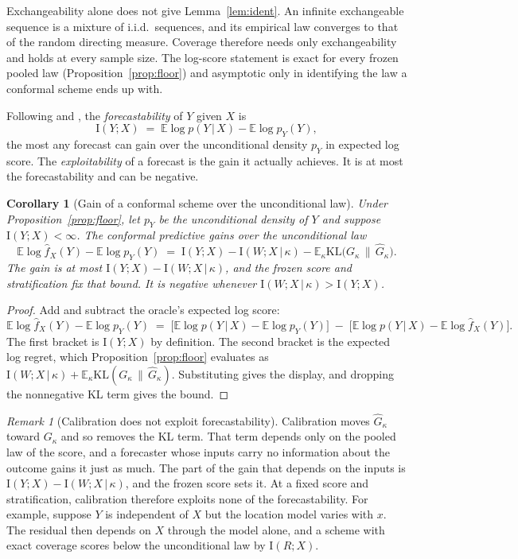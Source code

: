\documentclass[11pt]{article}
\newtheorem{corollary}[proposition]{Corollary}
\theoremstyle{remark}
\newtheorem{remark}[proposition]{Remark}
\newcommand{\E}{\mathbb{E}}
\newcommand{\I}{\mathrm{I}}
\newcommand{\given}{\,|\,}
\newcommand{\KLop}{\mathrm{KL}}
\begin{document}
Exchangeability alone does not give Lemma~\ref{lem:ident}. An infinite exchangeable
sequence is a mixture of i.i.d.\ sequences, and its empirical law converges to that of
the random directing measure. Coverage therefore needs only exchangeability and holds
at every sample size. The log-score statement is exact for every frozen pooled law
(Proposition~\ref{prop:floor}) and asymptotic only in identifying the law a conformal
scheme ends up with.

Following \citet{delsole2004} and \citet{catt2026}, the \emph{forecastability} of $Y$
given $X$ is
\[
\I(Y;X)\;=\;\E\log p(Y\given X)-\E\log p_Y(Y),
\]
the most any forecast can gain over the unconditional density $p_Y$ in expected log
score. The \emph{exploitability} of a forecast is the gain it actually achieves. It is
at most the forecastability and can be negative.

\begin{corollary}[Gain of a conformal scheme over the unconditional law]\label{cor:forecastability}
Under Proposition~\ref{prop:floor}, let $p_Y$ be the unconditional density of $Y$ and
suppose $\I(Y;X)<\infty$. The conformal predictive gains over the unconditional law
\[
\E\log\widehat f_X(Y)-\E\log p_Y(Y)
\;=\;\I(Y;X)-\I(W;X\given\kappa)-\E_\kappa\KLop\!\big(G_\kappa\,\|\,\widehat G_\kappa\big).
\]
The gain is at most $\I(Y;X)-\I(W;X\given\kappa)$, and the frozen score and
stratification fix that bound. It is negative whenever $\I(W;X\given\kappa)>\I(Y;X)$.
\end{corollary}

\begin{proof}
Add and subtract the oracle's expected log score:
\[
\E\log\widehat f_X(Y)-\E\log p_Y(Y)
\;=\;\big[\E\log p(Y\given X)-\E\log p_Y(Y)\big]
\;-\;\big[\E\log p(Y\given X)-\E\log\widehat f_X(Y)\big].
\]
The first bracket is $\I(Y;X)$ by definition. The second bracket is
the expected log regret, which Proposition~\ref{prop:floor} evaluates as
$\I(W;X\given\kappa)+\E_\kappa\KLop(G_\kappa\,\|\,\widehat G_\kappa)$. Substituting
gives the display, and dropping the nonnegative KL term gives the bound.
\end{proof}

\begin{remark}[Calibration does not exploit forecastability]\label{rem:calgain}
Calibration moves $\widehat G_\kappa$ toward $G_\kappa$ and so removes the KL term.
That term depends only on the pooled law of the score, and a forecaster whose inputs
carry no information about the outcome gains it just as much. The part of the gain
that depends on the inputs is $\I(Y;X)-\I(W;X\given\kappa)$, and the frozen score sets
it. At a fixed score and stratification, calibration therefore exploits none of the
forecastability. For example, suppose $Y$ is independent of $X$ but the location model varies with
$x$. The residual then depends on $X$ through the model alone, and a scheme with exact
coverage scores below the unconditional law by $\I(R;X)$.
\end{remark}
\end{document}
